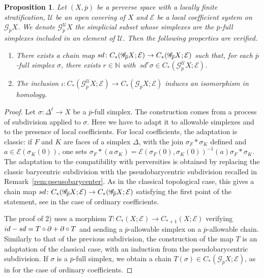 \documentclass[a4paper,10pt,english,reqno]{amsart}
\theoremstyle{plain}
\newtheorem{proposition}{Proposition}[section]
\theoremstyle{definition}
\theoremstyle{remark}
\numberwithin{equation}{section}
\newcommand{\remref}[1]{Remark~\ref{#1}}
\def\ov{\overline}
\def\cE{{\mathcal E}}
\def\cU{{\mathcal U}}
\def\crG{{\mathscr G}}
\def\N{\mathbb{N}}
\def\id{{\rm id}}
\def\sd{{\rm sd}}
\renewcommand\1{\hbox{\ding{192}}}
\renewcommand\2{\hbox{\ding{193}}}
\newcommand\3{\hbox{\ding{194}}}
\newcommand\4{\hbox{\ding{195}}}
\begin{document}
\begin{proposition}\label{prop:Usmall}
Let $(X,\ov{p})$ be a perverse space with a locally finite stratification, $\cU$ be an open covering  of $X$
and $\cE$ be a local coefficient system on $\crG_{\ov{p}}X$. 
We denote 
%
$\crG^{\cU}_{\ov{p}}X$
the simplicial subset  whose simplexes are the $\ov{p}$-full simplexes included in an element of $\cU$. 
Then the following properties are verified.
\begin{enumerate}[1)]
\item There exists a chain map $\sd \colon  C_*(\crG_{\ov{p}}X;\cE) \to C_*(\crG_{\ov{p}}X;\cE) $ such that, 
for each $\ov{p}$-full simplex $\sigma$, there exists $r \in \N$ 
with $\ sd^r \sigma \in  C_*(\crG_{\ov{p}}^\cU X; \cE)$.
%
\item The inclusion $\iota \colon  C_*(\crG_{\ov p}^{\cU}X;\cE) \to C_*(\crG_{\ov p}X;\cE)$ induces an isomorphism in homology.
\end{enumerate}
\end{proposition}

\begin{proof}
Let $\sigma\colon \Delta^\ell \to X$ be a $\ov{p}$-full simplex.
The construction comes from a  process of subdivision applied to  $\sigma$.   
Here we have to adapt it to allowable simplexes and to the presence of local coefficients.
%
For  local coefficients, the adaptation is classic: if $F$ and $K$ are faces of a simplex $\Delta$, 
with the join $\sigma_{F}\ast \sigma_{K}$ defined
and $a\in \cE(\sigma_{K}(0))$, one sets
$\sigma_{F}\ast (a\,\sigma_{K})=\cE(\sigma_{F}(0),\sigma_{K}(0))^{-1}(a) \sigma_{F}\ast \sigma_{K}$.
%
%
%
The adaptation to the compatibility with perversities is obtained by replacing the classic barycentric subdivision
with the pseudobarycentric subdivision recalled in \remref{rem:pseusobarycenter}.
As in the classical topological case, this gives a chain map 
$\sd \colon  C_*(\crG_{\ov{p}}X;\cE) \to C_*(\crG_{\ov{p}}X;\cE) $
satisfying the first point of the statement,
see \cite[Proposition 7]{CST8} in the case of ordinary coefficients.


\smallskip
The proof of 2) uses  a morphism
$T\colon C_{*}(X;\cE)\to C_{*+1}(X;\cE)$
verifying $\id -\sd =T\circ \partial+\partial\circ T$
and sending a $\ov{p}$-allowable simplex on a $\ov{p}$-allowable chain.
Similarly to that of the previous subdivision, the construction of the map $T$ is an adaptation of the classical case, 
with an induction from the pseudobarycentric subdivision.
%
%
%
If $\sigma$ is a $\ov{p}$-full simplex, we obtain a chain $T(\sigma)\in C_*(\crG_{\ov p}X;\cE)$,
as in  \cite[Proposition 6]{CST8}   for the case of ordinary coefficients. 
%
\end{proof}
\end{document}

